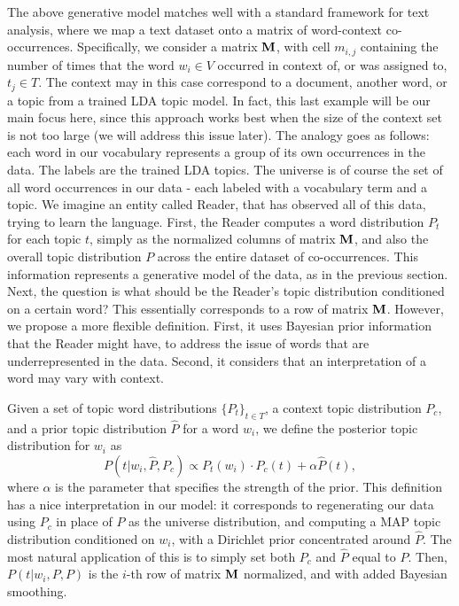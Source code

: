 
The above generative model matches well with a standard framework for
text analysis, where we map a text dataset onto a matrix of
word-context co-occurrences. Specifically, we consider a matrix $\operatorname{\mathbf{M}}$,
with cell $m_{i,j}$ containing the number of times that the word $w_i\in V$ 
occurred in context of, or was assigned to, $t_j\in T$. The context may
in this case correspond to a document, another word, or a topic
from a trained LDA topic model. In fact, this last example will be our main
focus here, since this approach works best when the size of the
context set is not too large (we will address this issue later). The
analogy goes as follows: each word in our vocabulary 
represents a group of its own occurrences in the data. The labels are
the trained LDA topics. The universe
is of course the set of all word occurrences in our data - each
labeled with a vocabulary term and a topic. We imagine an entity
called Reader, that has observed all of this data, trying to learn the
language. First, the Reader computes a word distribution $P_t$ for each
topic $t$, simply as the normalized columns of matrix $\operatorname{\mathbf{M}}$, and also
the overall topic distribution $P$ across the entire dataset of 
co-occurrences. This information represents a generative model of the
data, as in the previous section. Next, the question is what should be
the Reader's topic distribution conditioned on a certain word? This
essentially corresponds to a row of matrix $\operatorname{\mathbf{M}}$. However, we propose
a more flexible definition. First, it uses Bayesian prior
information that the Reader might have, to address the issue of words
that are underrepresented in the data. Second, it considers that an
interpretation of a word may vary with context.

\bed
Given a set of topic word distributions $\{P_t\}_{t\in T}$, a context topic
distribution $P_c$, and a prior topic distribution $\widehat{P}$ for a word $w_i$,
we define the posterior topic distribution for $w_i$ as
\[P(t|w_i,\widehat{P},P_c) \propto P_t(w_i)\cdot P_c(t) + \alpha
\widehat{P}(t),\]
where $\alpha$ is the parameter that specifies the strength of the prior.
\eed
This definition has a nice interpretation in our model: it corresponds
to regenerating our data using $P_c$ in place of $P$ as the
universe distribution, and computing a MAP topic distribution
conditioned on $w_i$, with a Dirichlet prior concentrated around
$\widehat{P}$. The most natural application of this is to simply set
both $P_c$ and $\widehat{P}$ equal to $P$. Then, $P(t|w_i,P,P)$ is the
$i$-th row of matrix $\operatorname{\mathbf{M}}$ normalized, and with added Bayesian
smoothing. 

